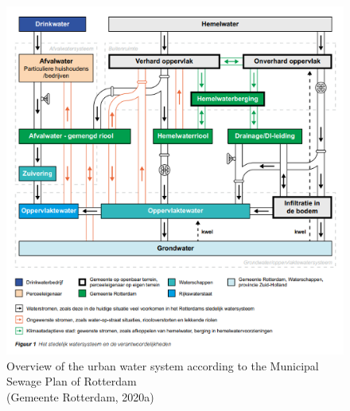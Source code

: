 \begin{figure}[htbp]
    \centering
    \includegraphics[width=0.75\linewidth]{figures/figures theory/rotterdam2020a.png}
    \caption{Overview of the urban water system according to the Municipal Sewage Plan of Rotterdam \\(Gemeente Rotterdam, 2020a)}
    \label{MSP}
\end{figure}

\\

